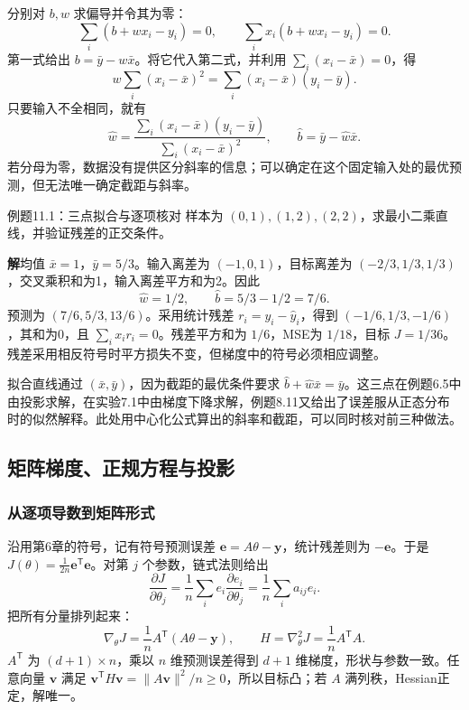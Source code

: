 \documentclass[UTF8,fontset=none,zihao=-4,a4paper]{ctexart}
\newcommand{\sol}{\par\noindent\textbf{解}\quad}
\numberwithin{equation}{section}
\numberwithin{figure}{section}
\begin{document}
分别对 $b,w$ 求偏导并令其为零：
\[
 \sum_i(b+wx_i-y_i)=0,\qquad
 \sum_i x_i(b+wx_i-y_i)=0.
\]
第一式给出 $b=\bar y-w\bar x$。将它代入第二式，并利用 $\sum_i(x_i-\bar x)=0$，得
\[
 w\sum_i(x_i-\bar x)^2=\sum_i(x_i-\bar x)(y_i-\bar y).
\]
只要输入不全相同，就有
\begin{equation}
 \widehat w=\frac{\sum_i(x_i-\bar x)(y_i-\bar y)}{\sum_i(x_i-\bar x)^2},
 \qquad \widehat b=\bar y-\widehat w\bar x.
\end{equation}
若分母为零，数据没有提供区分斜率的信息；可以确定在这个固定输入处的最优预测，但无法唯一确定截距与斜率。

\begin{infobox}{例题11.1：三点拟合与逐项核对}
样本为 $(0,1),(1,2),(2,2)$，求最小二乘直线，并验证残差的正交条件。
\end{infobox}
\sol 均值 $\bar x=1$，$\bar y=5/3$。输入离差为 $(-1,0,1)$，目标离差为 $(-2/3,1/3,1/3)$，交叉乘积和为1，输入离差平方和为2。因此
\[
 \widehat w=1/2,\qquad \widehat b=5/3-1/2=7/6.
\]
预测为 $(7/6,5/3,13/6)$。采用统计残差 $r_i=y_i-\widehat y_i$，得到 $(-1/6,1/3,-1/6)$，其和为0，且 $\sum_i x_ir_i=0$。残差平方和为 $1/6$，MSE为 $1/18$，目标 $J=1/36$。残差采用相反符号时平方损失不变，但梯度中的符号必须相应调整。

拟合直线通过 $(\bar x,\bar y)$，因为截距的最优条件要求 $\widehat b+\widehat w\bar x=\bar y$。这三点在例题6.5中由投影求解，在实验7.1中由梯度下降求解，例题8.11又给出了误差服从正态分布时的似然解释。此处用中心化公式算出的斜率和截距，可以同时核对前三种做法。

\subsection{矩阵梯度、正规方程与投影}
\subsubsection{从逐项导数到矩阵形式}
沿用第6章的符号，记有符号预测误差 $\symbf e=A\theta-\symbf y$，统计残差则为 $-\symbf e$。于是 $J(\theta)=\frac1{2n}\symbf e^{\mathsf T}\symbf e$。对第 $j$ 个参数，链式法则给出
\[
 \frac{\partial J}{\partial\theta_j}
 =\frac1n\sum_i e_i\frac{\partial e_i}{\partial\theta_j}
 =\frac1n\sum_i a_{ij}e_i.
\]
把所有分量排列起来：
\begin{equation}
 \nabla_\theta J=\frac1n A^{\mathsf T}(A\theta-\symbf y),
 \qquad H=\nabla^2_\theta J=\frac1n A^{\mathsf T}A.
\end{equation}
$A^{\mathsf T}$ 为 $(d+1)\times n$，乘以 $n$ 维预测误差得到 $d+1$ 维梯度，形状与参数一致。任意向量 $\symbf v$ 满足 $\symbf v^{\mathsf T}H\symbf v=\|A\symbf v\|^2/n\geq0$，所以目标凸；若 $A$ 满列秩，Hessian正定，解唯一。
\end{document}
